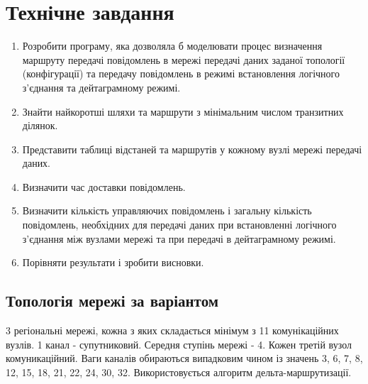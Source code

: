 \newpage
{}
\section*{Технічне завдання}

\renewcommand{\theenumi}{\arabic{enumi}}
\begin{enumerate}
    \item Розробити програму, яка дозволяла б моделювати процес визначення  маршруту передачі повідомлень в мережі передачі даних заданої топології (конфігурації) та передачу повідомлень в режимі встановлення логічного з’єднання та дейтаграмному режимі.
  \item Знайти найкоротші шляхи та маршрути з мінімальним числом транзитних ділянок.
  \item Представити таблиці відстаней та маршрутів у кожному вузлі мережі передачі даних.
  \item Визначити час доставки повідомлень.
  \item Визначити кількість управляючих повідомлень і загальну кількість повідомлень, необхідних для передачі даних при встановленні логічного з’єднання між вузлами мережі та при передачі в дейтаграмному режимі.
  \item Порівняти результати і зробити висновки.
\end{enumerate}
\subsection*{Топологія мережі за варіантом}
3 регіональні мережі, кожна з яких складається мінімум з 11 комунікаційних вузлів.
1 канал - супутниковий.
Середня ступінь мережі - 4.
Кожен третій вузол комуникаційний.
Ваги каналів обираються випадковим чином із значень 3, 6, 7, 8, 12, 15, 18, 21, 22, 24, 30, 32.
Використовується алгоритм дельта-маршрутизації.
